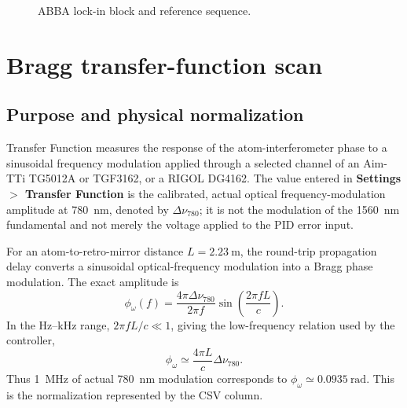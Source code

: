 \documentclass[11pt,oneside,openany]{book}
\newcommand{\code}[1]{\texttt{\detokenize{#1}}}
\newcommand{\ui}[1]{\textbf{#1}}
\begin{document}
\begin{figure}[htbp]
\centering
{}
\caption{ABBA lock-in block and reference sequence.}
\label{fig:abba}
\end{figure}

\section{Bragg transfer-function scan}
\subsection{Purpose and physical normalization}
Transfer Function measures the response of the atom-interferometer phase to a sinusoidal
frequency modulation applied through a selected channel of an Aim-TTi TG5012A or TGF3162,
or a RIGOL DG4162.
The value entered in \ui{Settings $>$ Transfer Function} is the calibrated, actual optical
frequency-modulation amplitude at \SI{780}{\nano\meter}, denoted by $\Delta\nu_{780}$; it
is not the modulation of the \SI{1560}{\nano\meter} fundamental and not merely the voltage
applied to the PID error input.

For an atom-to-retro-mirror distance $L=\SI{2.23}{\meter}$, the round-trip propagation
delay converts a sinusoidal optical-frequency modulation into a Bragg phase modulation.
The exact amplitude is
\begin{equation}
  \phi_\omega(f)=\frac{4\pi\Delta\nu_{780}}{2\pi f}
  \sin\!\left(\frac{2\pi fL}{c}\right).
\end{equation}
In the Hz--kHz range, $2\pi fL/c\ll1$, giving the low-frequency relation used by the
controller,
\begin{equation}
  \boxed{\phi_\omega\simeq\frac{4\pi L}{c}\Delta\nu_{780}}.
  \label{eq:transfer-bragg-phase}
\end{equation}
Thus \SI{1}{\mega\hertz} of actual \SI{780}{\nano\meter} modulation corresponds to
$\phi_\omega\simeq\SI{0.0935}{\radian}$. This is the normalization represented by the
\code{Bragg_Phase_Modulation_Rad} CSV column.
\end{document}
